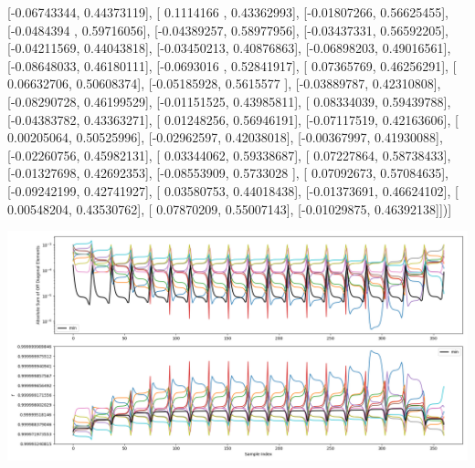 \documentclass{article}
\begin{document}
       [-0.06743344,  0.44373119],
       [ 0.1114166 ,  0.43362993],
       [-0.01807266,  0.56625455],
       [-0.0484394 ,  0.59716056],
       [-0.04389257,  0.58977956],
       [-0.03437331,  0.56592205],
       [-0.04211569,  0.44043818],
       [-0.03450213,  0.40876863],
       [-0.06898203,  0.49016561],
       [-0.08648033,  0.46180111],
       [-0.0693016 ,  0.52841917],
       [ 0.07365769,  0.46256291],
       [ 0.06632706,  0.50608374],
       [-0.05185928,  0.5615577 ],
       [-0.03889787,  0.42310808],
       [-0.08290728,  0.46199529],
       [-0.01151525,  0.43985811],
       [ 0.08334039,  0.59439788],
       [-0.04383782,  0.43363271],
       [ 0.01248256,  0.56946191],
       [-0.07117519,  0.42163606],
       [ 0.00205064,  0.50525996],
       [-0.02962597,  0.42038018],
       [-0.00367997,  0.41930088],
       [-0.02260756,  0.45982131],
       [ 0.03344062,  0.59338687],
       [ 0.07227864,  0.58738433],
       [-0.01327698,  0.42692353],
       [-0.08553909,  0.5733028 ],
       [ 0.07092673,  0.57084635],
       [-0.09242199,  0.42741927],
       [ 0.03580753,  0.44018438],
       [-0.01373691,  0.46624102],
       [ 0.00548204,  0.43530762],
       [ 0.07870209,  0.55007143],
       [-0.01029875,  0.46392138]])]
\begin{center}
\includegraphics[scale=.9]{report_pickled_controls225/control_dpn_all.png}

\end{center}
\end{document}
